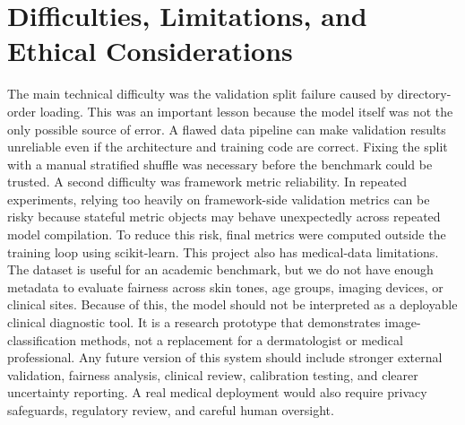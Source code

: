\documentclass{article}
\begin{document}
\section{Difficulties, Limitations, and Ethical Considerations}
The main technical difficulty was the validation split failure caused by directory-order loading.
This was an important lesson because the model itself was not the only possible source of error.
A flawed data pipeline can make validation results unreliable even if the architecture and training
code are correct. Fixing the split with a manual stratified shuffle was necessary before the benchmark
could be trusted.
A second difficulty was framework metric reliability. In repeated experiments, relying too heavily on
framework-side validation metrics can be risky because stateful metric objects may behave
unexpectedly across repeated model compilation. To reduce this risk, final metrics were computed
outside the training loop using scikit-learn.
This project also has medical-data limitations. The dataset is useful for an academic benchmark, but
we do not have enough metadata to evaluate fairness across skin tones, age groups, imaging devices,
or clinical sites. Because of this, the model should not be interpreted as a deployable clinical
diagnostic tool. It is a research prototype that demonstrates image-classification methods, not a
replacement for a dermatologist or medical professional.
Any future version of this system should include stronger external validation, fairness analysis,
clinical review, calibration testing, and clearer uncertainty reporting. A real medical deployment
would also require privacy safeguards, regulatory review, and careful human oversight.
\end{document}

